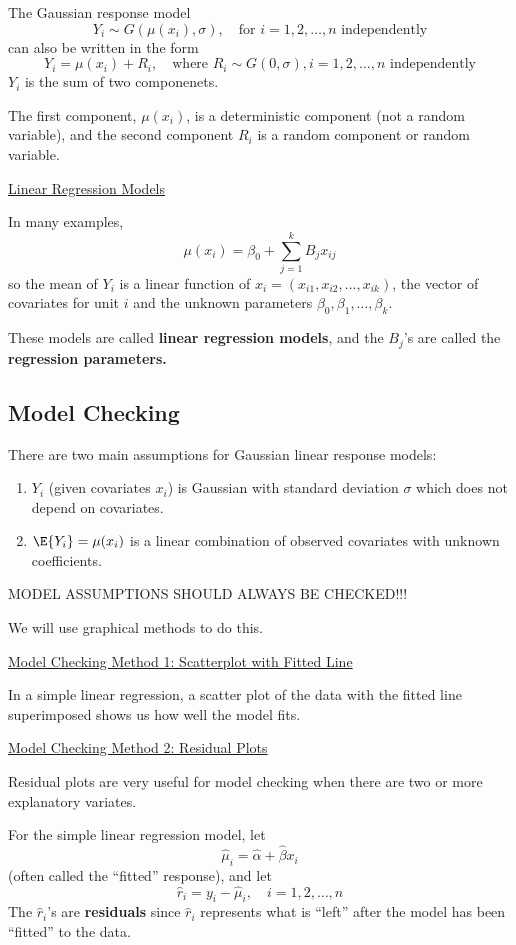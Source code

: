 \documentclass[oneside]{book}
\begin{document}
The Gaussian response model
\[Y_{i} \sim G\left(\mu\left(x_{i}\right), \sigma\right), \quad \text{for } i=1,2, \ldots, n \text{ independently}\]
can also be written in the form
\[Y_{i}=\mu\left(x_{i}\right)+R_{i}, \quad \text{where } R_{i} \sim G(0, \sigma), i=1,2, \ldots, n \text{ independently}\]
$ Y_i $ is the sum of two componenets.

The first component, $ \mu(x_i) $, is a deterministic component (not a random variable),
and the second component $ R_i $ is a random component or random variable.

\underline{Linear Regression Models}

In many examples,
\[ \mu(x_i)=\beta_0+\sum\limits_{j=1}^{k} B_j x_{ij} \]
so the mean of $ Y_i $ is a linear function of $ x_i=(x_{i1},x_{i2},\ldots ,x_{ik}) $,
the vector of covariates for unit $ i $ and the unknown parameters $ \beta_0,\beta_1,\ldots ,\beta_k $.

These models are called \textbf{linear regression models}, and the $ B_j $'s are called the
\textbf{regression parameters.}

\subsection{Model Checking}
There are two main assumptions for Gaussian linear response models:
\begin{enumerate}
    \item $ Y_i $ (given covariates $ x_i $) is Gaussian with standard deviation $ \sigma $
          which does not depend on covariates.
    \item $ \E{Y_i}=\mu(x_i) $ is a linear combination of observed covariates with
          unknown coefficients.
\end{enumerate}
\begin{center}
    MODEL ASSUMPTIONS SHOULD ALWAYS BE CHECKED!!!
\end{center}
We will use graphical methods to do this.

\underline{Model Checking Method 1: Scatterplot with Fitted Line}

In a simple linear regression, a scatter plot of the data with the fitted line superimposed
shows us how well the model fits.

\underline{Model Checking Method 2: Residual Plots}

Residual plots are very useful for model checking when there are two or more explanatory
variates.

\begin{Definition}{}{}
    For the simple linear regression model, let
    \[ \hat{\mu}_i=\hat{\alpha}+\hat{\beta}x_i \]
    (often called the ``fitted'' response), and let
    \[ \hat{r}_i=y_i-\hat{\mu}_i,\quad i=1,2,\ldots ,n \]
    The $ \hat{r}_i $'s are \textbf{residuals} since $ \hat{r}_i $ represents
    what is ``left'' after the model has been ``fitted'' to the data.
\end{Definition}
\end{document}
